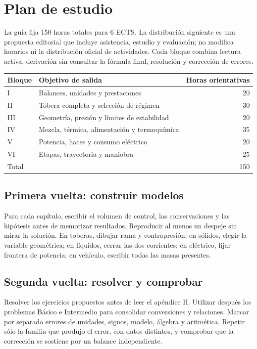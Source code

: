 \chapter{Plan de estudio}\label{app:study}
La guía fija 150 horas totales para 6 ECTS. La distribución siguiente es una propuesta editorial que incluye asistencia, estudio y evaluación; no modifica horarios ni la distribución oficial de actividades. Cada bloque combina lectura activa, derivación sin consultar la fórmula final, resolución y corrección de errores.
\begin{center}\begin{tabular}{llr}\toprule Bloque&Objetivo de salida&Horas orientativas\\\midrule
I&Balances, unidades y prestaciones&20\\
II&Tobera completa y selección de régimen&30\\
III&Geometría, presión y límites de estabilidad&20\\
IV&Mezcla, térmica, alimentación y termoquímica&35\\
V&Potencia, haces y consumo eléctrico&20\\
VI&Etapas, trayectoria y maniobra&25\\\midrule Total&&150\\\bottomrule\end{tabular}\end{center}
\section{Primera vuelta: construir modelos}
Para cada capítulo, escribir el volumen de control, las conservaciones y las hipótesis antes de memorizar resultados. Reproducir al menos un despeje sin mirar la solución. En toberas, dibujar rama y contrapresión; en sólidos, elegir la variable geométrica; en líquidos, cerrar las dos corrientes; en eléctrico, fijar frontera de potencia; en vehículo, escribir todas las masas presentes.
\section{Segunda vuelta: resolver y comprobar}
Resolver los ejercicios propuestos antes de leer el apéndice H. Utilizar después los problemas Básico e Intermedio para consolidar conversiones y relaciones. Marcar por separado errores de unidades, signos, modelo, álgebra y aritmética. Repetir sólo la familia que produjo el error, con datos distintos, y comprobar que la corrección se sostiene por un balance independiente.
